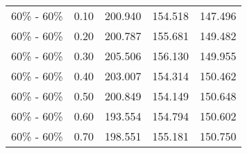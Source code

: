 \begin{tabular}{lrrrr}
                              60\% - 60\% &                        0.10 & 200.940 & 154.518 & 147.496 \\
                              60\% - 60\% &                        0.20 & 200.787 & 155.681 & 149.482 \\
                              60\% - 60\% &                        0.30 & 205.506 & 156.130 & 149.955 \\
                              60\% - 60\% &                        0.40 & 203.007 & 154.314 & 150.462 \\
                              60\% - 60\% &                        0.50 & 200.849 & 154.149 & 150.648 \\
                              60\% - 60\% &                        0.60 & 193.554 & 154.794 & 150.602 \\
                              60\% - 60\% &                        0.70 & 198.551 & 155.181 & 150.750 \\
\bottomrule
\end{tabular}


